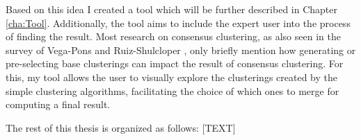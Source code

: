 Based on this idea I created a tool which will be further described in Chapter \ref{cha:Tool}. Additionally, the tool aims to include the expert user into the process of finding the result. Most research on consensus clustering, as also seen in the survey of Vega-Pons and Ruiz-Shulcloper \cite{survey1}, only briefly mention how generating or pre-selecting base clusterings can impact the result of consensus clustering. For this, my tool allows the user to visually explore the clusterings created by the simple clustering algorithms, facilitating the choice of which ones to merge for computing a final result.

The rest of this thesis is organized as follows: [TEXT]

